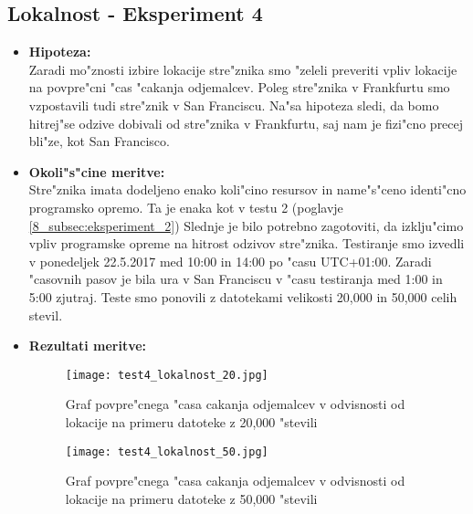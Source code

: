 \subsection{Lokalnost - Eksperiment 4}
\label{8_subsec:eksperiment_4}
\begin{itemize}
	\item \textbf{Hipoteza: }  \\
		Zaradi mo"znosti izbire lokacije stre"znika smo "zeleli preveriti vpliv lokacije na povpre"cni "cas "cakanja odjemalcev. Poleg stre"znika v Frankfurtu smo vzpostavili tudi stre"znik v San Franciscu. Na"sa hipoteza sledi, da bomo hitrej"se odzive dobivali od stre"znika v Frankfurtu, saj nam je fizi"cno precej bli"ze, kot San Francisco.		
	\item \textbf{Okoli"s"cine meritve: } \\
		Stre"znika imata dodeljeno enako koli"cino resursov in name"s"ceno identi"cno programsko opremo. Ta je enaka kot v testu 2 (poglavje \ref{8_subsec:eksperiment_2}) Slednje je bilo potrebno zagotoviti, da izklju"cimo vpliv programske opreme na hitrost odzivov stre"znika. Testiranje smo izvedli v ponedeljek 22.5.2017 med 10:00 in 14:00 po "casu UTC+01:00. Zaradi "casovnih pasov je bila ura v San Franciscu v "casu testiranja med 1:00 in 5:00 zjutraj. Teste smo ponovili z datotekami velikosti 20,000 in 50,000 celih stevil.
		
 	\item \textbf{Rezultati meritve: }  \\
		\begin{figure}[h]
  		\centering
  		  \texttt{[image: test4\_lokalnost\_20.jpg]}
  		\caption{Graf povpre"cnega "casa cakanja odjemalcev v odvisnosti od lokacije na primeru datoteke z 20,000 "stevili}
  		\label{8_graf_lokalnost_20}
		\end{figure}
		
		\begin{figure}[h]
  		\centering
  		  \texttt{[image: test4\_lokalnost\_50.jpg]}
  		\caption{Graf povpre"cnega "casa cakanja odjemalcev v odvisnosti od lokacije na primeru datoteke z 50,000 "stevili}
  		\label{8_graf_lokalnost_50}
		\end{figure}
		

\end{itemize}
